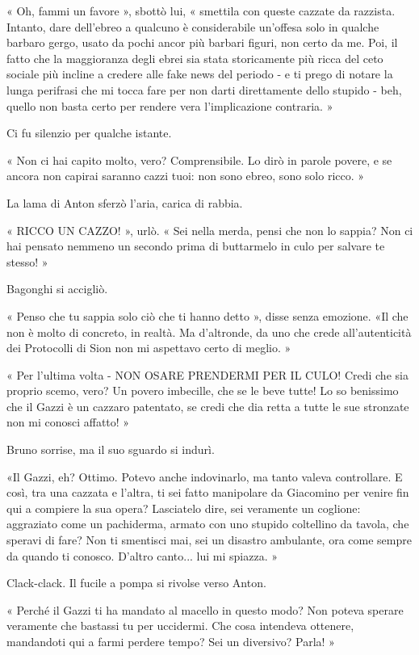 « Oh, fammi un favore », sbottò lui, « smettila con queste cazzate da razzista. Intanto, dare dell'ebreo a qualcuno è considerabile un'offesa solo in qualche barbaro gergo, usato da pochi ancor più barbari figuri, non certo da me. Poi, il fatto che la maggioranza degli ebrei sia stata storicamente più ricca del ceto sociale più incline a credere alle fake news del periodo - e ti prego di notare la lunga perifrasi che mi tocca fare per non darti direttamente dello stupido - beh, quello non basta certo per rendere vera l'implicazione contraria. »

Ci fu silenzio per qualche istante.

« Non ci hai capito molto, vero? Comprensibile. Lo dirò in parole povere, e se ancora non capirai saranno cazzi tuoi: non sono ebreo, sono solo ricco. »

La lama di Anton sferzò l'aria, carica di rabbia.

« RICCO UN CAZZO! », urlò. « Sei nella merda, pensi che non lo sappia? Non ci hai pensato nemmeno un secondo prima di buttarmelo in culo per salvare te stesso! »

Bagonghi si accigliò.

« Penso che tu sappia solo ciò che ti hanno detto », disse senza emozione. «Il che non è molto di concreto, in realtà. Ma d'altronde, da uno che crede all'autenticità dei Protocolli di Sion non mi aspettavo certo di meglio. »

« Per l'ultima volta - NON OSARE PRENDERMI PER IL CULO! Credi che sia proprio scemo, vero? Un povero imbecille, che se le beve tutte! Lo so benissimo che il Gazzi è un cazzaro patentato, se credi che dia retta a tutte le sue stronzate non mi conosci affatto! »

Bruno sorrise, ma il suo sguardo si indurì.

«Il Gazzi, eh? Ottimo. Potevo anche indovinarlo, ma tanto valeva controllare. E così, tra una cazzata e l'altra, ti sei fatto manipolare da Giacomino per venire fin qui a compiere la sua opera? Lasciatelo dire, sei veramente un coglione: aggraziato come un pachiderma, armato con uno stupido coltellino da tavola, che speravi di fare? Non ti smentisci mai, sei un disastro ambulante, ora come sempre da quando ti conosco. D'altro canto... lui mi spiazza. »

Clack-clack. Il fucile a pompa si rivolse verso Anton.

« Perché il Gazzi ti ha mandato al macello in questo modo? Non poteva sperare veramente che bastassi tu per uccidermi. Che cosa intendeva ottenere, mandandoti qui a farmi perdere tempo? Sei un diversivo? Parla! »

